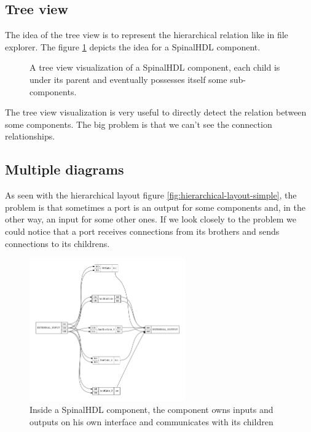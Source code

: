 \subsection{Tree view}

The idea of the tree view is to represent the hierarchical relation like in file
explorer. The figure \ref{fig:tree-view} depicts the idea for a SpinalHDL
component.

\begin{figure}[H]
  \centering
  \caption[SpinalHDL's Component visualization with tree view]{A tree view
    visualization of a SpinalHDL component, each child is under its parent and
    eventually possesses itself some sub-components.}
  \label{fig:tree-view}
\end{figure}

The tree view visualization is very useful to directly detect the relation
between some components. The big problem is that we can't see the connection
relationships.

\subsection{Multiple diagrams}

As seen with the hierarchical layout figure
\ref{fig:hierarchical-layout-simple}, the problem is that sometimes a port is an
output for some components and, in the other way, an input for some other
ones. If we look closely to the problem we could notice that a port receives
connections from its brothers and sends connections to its childrens.

\begin{figure}[H]
  \centering
  \includegraphics[width=0.6\textwidth]{img/HierarchicComponent.pdf}
  \caption[SpinalHDL Component inside]{Inside a SpinalHDL component, the
    component owns inputs and outputs on his own interface and communicates
  with its children}
  \label{fig:hierarchic-component}
\end{figure}

